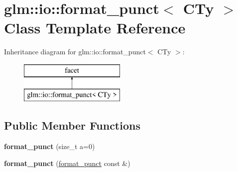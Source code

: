 \hypertarget{classglm_1_1io_1_1format__punct}{}\section{glm\+:\+:io\+:\+:format\+\_\+punct$<$ C\+Ty $>$ Class Template Reference}
\label{classglm_1_1io_1_1format__punct}
Inheritance diagram for glm\+:\+:io\+:\+:format\+\_\+punct$<$ C\+Ty $>$\+:\begin{figure}[H]
\begin{center}
\leavevmode
\includegraphics[height=2.000000cm]{classglm_1_1io_1_1format__punct}
\end{center}
\end{figure}
\subsection*{Public Member Functions}
\begin{DoxyCompactItemize}
\item 
{\bfseries format\+\_\+punct} (size\+\_\+t a=0)\hypertarget{classglm_1_1io_1_1format__punct_ae56e7a14fac2516658837281b9da4659}{}\label{classglm_1_1io_1_1format__punct_ae56e7a14fac2516658837281b9da4659}

\item 
{\bfseries format\+\_\+punct} (\hyperlink{classglm_1_1io_1_1format__punct}{format\+\_\+punct} const \&)\hypertarget{classglm_1_1io_1_1format__punct_a89a8c3cfb0b975f3dd8c0416101c59b7}{}\label{classglm_1_1io_1_1format__punct_a89a8c3cfb0b975f3dd8c0416101c59b7}

\end{DoxyCompactItemize}
